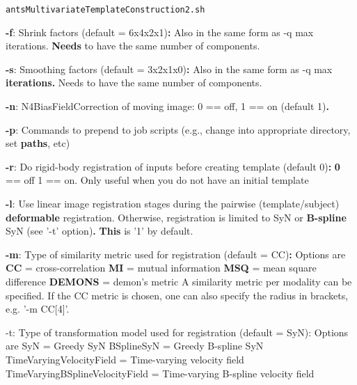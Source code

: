 \documentclass[ignorenonframetext,]{beamer}
\newenvironment{Shaded}{\begin{snugshade}}{\end{snugshade}}
\newcommand{\KeywordTok}[1]{\textcolor[rgb]{0.13,0.29,0.53}{\textbf{{#1}}}}
\newcommand{\StringTok}[1]{\textcolor[rgb]{0.31,0.60,0.02}{{#1}}}
\newcommand{\NormalTok}[1]{{#1}}
\begin{document}
\begin{frame}[fragile]{\texttt{antsMultivariateTemplateConstruction2.sh}}
\begin{Shaded}
\begin{Highlighting}[]
     \KeywordTok{-f}\NormalTok{:  Shrink factors (default = 6x4x2x1)}\KeywordTok{:}  \NormalTok{Also in the same form as -q max iterations.}
          \KeywordTok{Needs} \NormalTok{to have the same number of components.}

     \KeywordTok{-s}\NormalTok{:  Smoothing factors (default = 3x2x1x0)}\KeywordTok{:}  \NormalTok{Also in the same form as -q max}
          \KeywordTok{iterations.}  \NormalTok{Needs to have the same number of components.}

     \KeywordTok{-n}\NormalTok{:  N4BiasFieldCorrection of moving image: 0 == off, 1 == on (default 1)}\KeywordTok{.}

     \KeywordTok{-p}\NormalTok{:  Commands to prepend to job scripts (e.g., change into appropriate directory, set}
          \KeywordTok{paths}\NormalTok{, etc)}

     \KeywordTok{-r}\NormalTok{:  Do rigid-body registration of inputs before creating template (default 0)}\KeywordTok{:}
          \KeywordTok{0} \NormalTok{== off 1 == on. Only useful when you do not have an initial template}

     \KeywordTok{-l}\NormalTok{:  Use linear image registration stages during the pairwise (template/subject)}
          \KeywordTok{deformable} \NormalTok{registration.  Otherwise, registration is limited to SyN or}
          \KeywordTok{B-spline} \NormalTok{SyN (see }\StringTok{'-t'} \NormalTok{option)}\KeywordTok{.}  \KeywordTok{This} \NormalTok{is }\StringTok{'1'} \NormalTok{by default.}

     \KeywordTok{-m}\NormalTok{:  Type of similarity metric used for registration (default = CC)}\KeywordTok{:}  \NormalTok{Options are}
            \KeywordTok{CC} \NormalTok{= cross-correlation}
            \KeywordTok{MI} \NormalTok{= mutual information}
            \KeywordTok{MSQ} \NormalTok{= mean square difference}
            \KeywordTok{DEMONS} \NormalTok{= demon}\StringTok{'s metric}
\StringTok{          A similarity metric per modality can be specified.  If the CC metric is chosen,}
\StringTok{          one can also specify the radius in brackets, e.g. '}\NormalTok{-m CC[4]}\StringTok{'.}

\StringTok{     -t:  Type of transformation model used for registration (default = SyN):  Options are}
\StringTok{            SyN = Greedy SyN}
\StringTok{            BSplineSyN = Greedy B-spline SyN}
\StringTok{            TimeVaryingVelocityField = Time-varying velocity field}
\StringTok{            TimeVaryingBSplineVelocityField = Time-varying B-spline velocity field}


\end{Highlighting}
\end{Shaded}
\end{frame}
\end{document}
